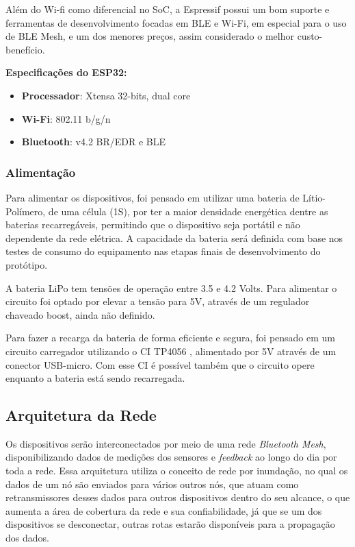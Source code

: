 \documentclass[../monografia.tex]{subfiles}
\begin{document}
Além do Wi-fi como diferencial no SoC, a Espressif possui um bom suporte e ferramentas de desenvolvimento focadas em BLE e Wi-Fi, em especial para o uso de BLE Mesh, e um dos menores preços, assim considerado o melhor custo-benefício. 

\textbf{Especificações do ESP32:} \cite{ESP-datasheet}
\begin{itemize}
\item \textbf{Processador}: Xtensa 32-bits, dual core
\item \textbf{Wi-Fi}: 802.11 b/g/n
\item \textbf{Bluetooth}: v4.2 BR/EDR e BLE
\end{itemize}



\subsubsection{Alimentação}

Para alimentar os dispositivos, foi pensado em utilizar uma bateria de Lítio-Polímero, de uma célula (1S), por ter a maior densidade energética dentre as baterias recarregáveis, permitindo que o dispositivo seja portátil e não dependente da rede elétrica. A capacidade da bateria será definida com base nos testes de consumo do equipamento nas etapas finais de desenvolvimento do protótipo. 

A bateria LiPo tem tensões de operação entre 3.5 e 4.2 Volts. Para alimentar o circuito foi optado por elevar a tensão para 5V, através de um regulador chaveado boost, ainda não definido. 

Para fazer a recarga da bateria de forma eficiente e segura, foi pensado em um circuito carregador utilizando o CI TP4056 \cite{tp4056}, alimentado por 5V através de um conector USB-micro. Com esse CI é possível também que o circuito opere enquanto a bateria está sendo recarregada. 

\subsection{Arquitetura da Rede}

Os dispositivos serão interconectados por meio de uma rede \textit{Bluetooth Mesh}, disponibilizando dados de medições dos sensores e \textit{feedback} ao longo do dia por toda a rede. Essa arquitetura utiliza o conceito de rede por inundação, no qual os dados de um nó são enviados para vários outros nós, que atuam como retransmissores desses dados para outros dispositivos dentro do seu alcance, o que aumenta a área de cobertura da rede e sua confiabilidade, já que se um dos dispositivos se desconectar, outras rotas estarão disponíveis para a propagação dos dados.
\end{document}
